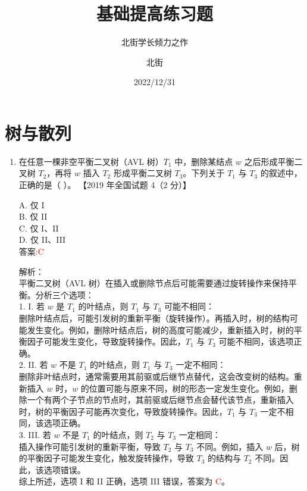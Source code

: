\documentclass[lang=cn,newtx,10pt,scheme=chinese]{../../../elegantbook}
\title{基础提高练习题}
\subtitle{北街学长倾力之作}
\author{北街}
\date{2022/12/31}
\begin{document}
\maketitle
\frontmatter

\tableofcontents

\mainmatter





\chapter{树与散列}


\begin{enumerate}
    \item 在任意一棵非空平衡二叉树（AVL 树）$T_1$ 中，删除某结点 $w$ 之后形成平衡二叉树 $T_2$，再将 $w$ 插入 $T_2$ 形成平衡二叉树 $T_3$。下列关于 $T_1$ 与 $T_3$ 的叙述中，正确的是（ ）。  
    【2019 年全国试题 4（2 分）】  

    A. 仅 I \\  
    B. 仅 II \\  
    C. 仅 I、II \\  
    D. 仅 II、III \\  

    答案:\textcolor{red}{C}

    解析：\\
    平衡二叉树（AVL 树）在插入或删除节点后可能需要通过旋转操作来保持平衡。分析三个选项：\\
    1. I. 若 $w$ 是 $T_1$ 的叶结点，则 $T_1$ 与 $T_3$ 可能不相同：\\
       删除叶结点后，可能引发树的重新平衡（旋转操作）。再插入时，树的结构可能发生变化。例如，删除叶结点后，树的高度可能减少，重新插入时，树的平衡因子可能发生变化，导致旋转操作。因此，$T_1$ 与 $T_3$ 可能不相同，该选项正确。\\
    2. II. 若 $w$ 不是 $T_1$ 的叶结点，则 $T_1$ 与 $T_3$ 一定不相同：\\
       删除非叶结点时，通常需要用其前驱或后继节点替代，这会改变树的结构。重新插入 $w$ 时，$w$ 的位置可能与原来不同，树的形态一定发生变化。例如，删除一个有两个子节点的节点时，其前驱或后继节点会替代该节点，重新插入时，树的平衡因子可能再次变化，导致旋转操作。因此，$T_1$ 与 $T_3$ 一定不相同，该选项正确。\\
    3. III. 若 $w$ 不是 $T_1$ 的叶结点，则 $T_2$ 与 $T_3$ 一定相同：\\
       插入操作可能引发树的重新平衡，导致 $T_2$ 与 $T_3$ 不同。例如，插入 $w$ 后，树的平衡因子可能发生变化，触发旋转操作，导致 $T_3$ 的结构与 $T_2$ 不同。因此，该选项错误。\\
    综上所述，选项 I 和 II 正确，选项 III 错误，答案为 \textcolor{red}{C}。\\




\end{enumerate}
\end{document}
